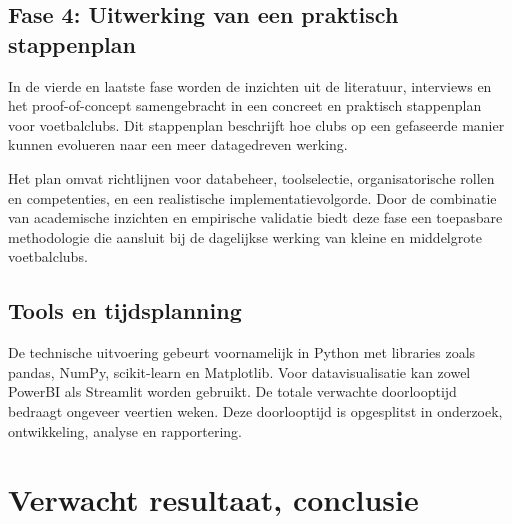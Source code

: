\subsection*{Fase 4: Uitwerking van een praktisch stappenplan}
In de vierde en laatste fase worden de inzichten uit de literatuur, interviews en het proof-of-concept samengebracht in een concreet en praktisch stappenplan voor voetbalclubs.
Dit stappenplan beschrijft hoe clubs op een gefaseerde manier kunnen evolueren naar een meer datagedreven werking.

Het plan omvat richtlijnen voor databeheer, toolselectie, organisatorische rollen en competenties, en een realistische implementatievolgorde.
Door de combinatie van academische inzichten en empirische validatie biedt deze fase een toepasbare methodologie die aansluit bij de dagelijkse werking van kleine en middelgrote voetbalclubs.

\subsection*{Tools en tijdsplanning}
De technische uitvoering gebeurt voornamelijk in Python met libraries zoals pandas, NumPy, scikit-learn en Matplotlib.
Voor datavisualisatie kan zowel PowerBI als Streamlit worden gebruikt.
De totale verwachte doorlooptijd bedraagt ongeveer veertien weken. Deze doorlooptijd is opgesplitst in onderzoek, ontwikkeling, analyse en rapportering.

\section{Verwacht resultaat, conclusie}%
\label{sec:verwachte_resultaten}

